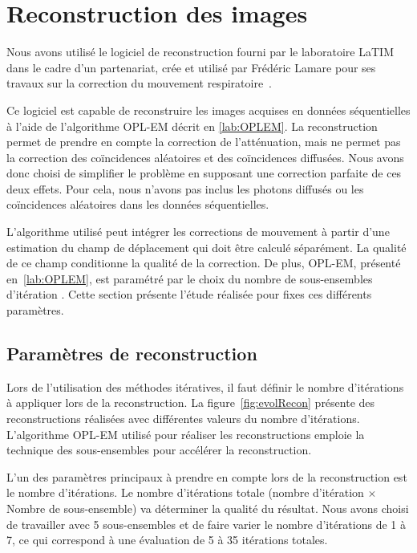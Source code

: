 \section{Reconstruction des images}
Nous avons utilisé le logiciel de reconstruction fourni par le laboratoire LaTIM dans le cadre d'un partenariat, crée et utilisé par Frédéric Lamare pour ses travaux sur la correction du mouvement respiratoire~\cite{lamare2007list}.

Ce logiciel est capable de reconstruire les images acquises en données séquentielles à l'aide de l'algorithme OPL-EM décrit en \ref{lab:OPLEM}. La reconstruction permet de prendre en compte la correction de l'atténuation, mais ne permet pas la correction des coïncidences aléatoires et des coïncidences diffusées. Nous avons donc choisi de simplifier le problème en supposant une correction parfaite de ces deux effets. Pour cela, nous n'avons pas inclus les photons diffusés ou les coïncidences aléatoires dans les données séquentielles. 

L'algorithme utilisé peut intégrer les corrections de mouvement à partir d'une estimation du champ de déplacement qui doit être calculé séparément. La qualité de ce champ conditionne la qualité de la correction. De plus, OPL-EM, présenté en~\ref{lab:OPLEM}, est paramétré par le choix du nombre de sous-ensembles d'itération . Cette section présente l'étude réalisée pour fixes ces différents paramètres.

\subsection{Paramètres de reconstruction}
\label{lab:paramRecon}

Lors de l'utilisation des méthodes itératives, il faut définir le nombre d'itérations à appliquer lors de la reconstruction. La figure~\ref{fig:evolRecon} présente des reconstructions  réalisées avec différentes valeurs du nombre d'itérations. L'algorithme OPL-EM utilisé pour réaliser les reconstructions emploie la technique des sous-ensembles pour accélérer la reconstruction.

L'un des paramètres principaux à prendre en compte lors de la reconstruction est le nombre d'itérations. Le nombre d'itérations totale (nombre d'itération $\times$ Nombre de sous-ensemble) va déterminer la qualité du résultat. Nous avons choisi de travailler avec 5 sous-ensembles et de faire varier le nombre d'itérations de 1 à 7, ce qui correspond à une évaluation de 5 à 35 itérations totales.

